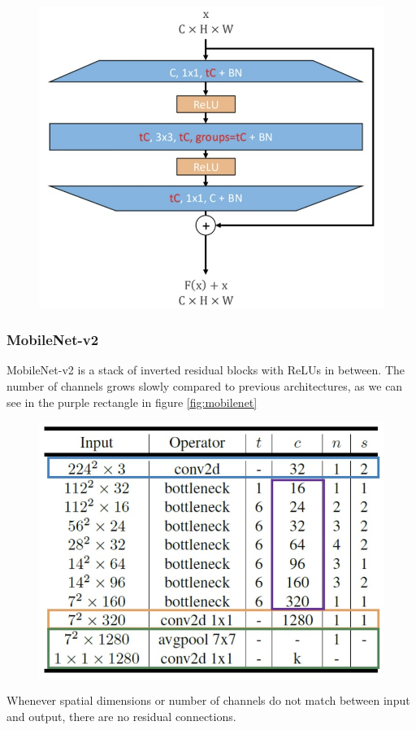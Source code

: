 \begin{figure}[htbp]
  \centering
  \includegraphics[width=0.8\linewidth]{./img/inverted_residual.jpg}
\end{figure}

\subsubsection{MobileNet-v2}
MobileNet-v2 is a stack of inverted residual blocks with ReLUs in between.
The number of channels grows slowly compared to previous architectures, as we can see in the purple rectangle in figure \ref{fig:mobilenet}

\begin{figure}[htbp]
  \centering
  \includegraphics[width=0.8\linewidth]{./img/mobilenet.jpg}
  \label{ref:mobilenet}
\end{figure}

Whenever spatial dimensions or number of channels do not match between input and output, there are no residual connections.

